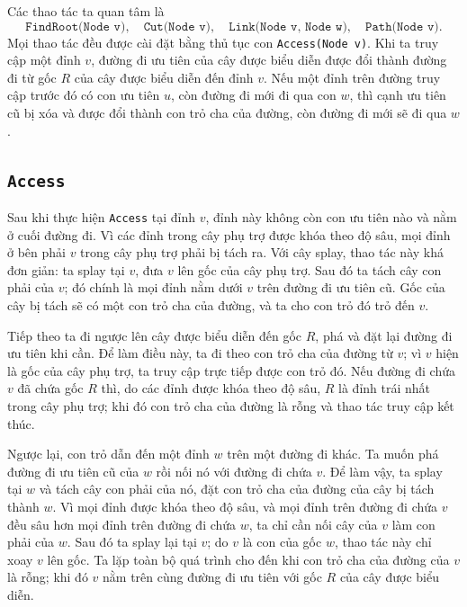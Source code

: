 \documentclass[11pt]{article}
\begin{document}
Các thao tác ta quan tâm là
\[
  \texttt{FindRoot(Node v)},\quad
  \texttt{Cut(Node v)},\quad
  \texttt{Link(Node v, Node w)},\quad
  \texttt{Path(Node v)}.
\]
Mọi thao tác đều được cài đặt bằng thủ tục con \texttt{Access(Node v)}. Khi ta truy cập một đỉnh
$v$, đường đi ưu tiên của cây được biểu diễn được đổi thành đường đi từ gốc $R$
của cây được biểu diễn đến đỉnh $v$. Nếu một đỉnh trên đường truy cập trước đó
có con ưu tiên $u$, còn đường đi mới đi qua con $w$, thì cạnh ưu tiên cũ bị xóa
và được đổi thành con trỏ cha của đường, còn đường đi mới sẽ đi qua $w$.

\subsection{\texttt{Access}}

Sau khi thực hiện \texttt{Access} tại đỉnh $v$, đỉnh này không còn con ưu tiên
nào và nằm ở cuối đường đi. Vì các đỉnh trong cây phụ trợ được khóa theo độ
sâu, mọi đỉnh ở bên phải $v$ trong cây phụ trợ phải bị tách ra. Với cây splay,
thao tác này khá đơn giản: ta splay tại $v$, đưa $v$ lên gốc của cây phụ trợ.
Sau đó ta tách cây con phải của $v$; đó chính là mọi đỉnh nằm dưới $v$ trên
đường đi ưu tiên cũ. Gốc của cây bị tách sẽ có một con trỏ cha của đường, và
ta cho con trỏ đó trỏ đến $v$.

Tiếp theo ta đi ngược lên cây được biểu diễn đến gốc $R$, phá và đặt lại đường
đi ưu tiên khi cần. Để làm điều này, ta đi theo con trỏ cha của đường từ $v$;
vì $v$ hiện là gốc của cây phụ trợ, ta truy cập trực tiếp được con trỏ đó. Nếu
đường đi chứa $v$ đã chứa gốc $R$ thì, do các đỉnh được khóa theo độ sâu, $R$
là đỉnh trái nhất trong cây phụ trợ; khi đó con trỏ cha của đường là rỗng và
thao tác truy cập kết thúc.

Ngược lại, con trỏ dẫn đến một đỉnh $w$ trên một đường đi khác. Ta muốn phá
đường đi ưu tiên cũ của $w$ rồi nối nó với đường đi chứa $v$. Để làm vậy, ta
splay tại $w$ và tách cây con phải của nó, đặt con trỏ cha của đường của cây
bị tách thành $w$. Vì mọi đỉnh được khóa theo độ sâu, và mọi đỉnh trên đường
đi chứa $v$ đều sâu hơn mọi đỉnh trên đường đi chứa $w$, ta chỉ cần nối cây
của $v$ làm con phải của $w$. Sau đó ta splay lại tại $v$; do $v$ là con của
gốc $w$, thao tác này chỉ xoay $v$ lên gốc. Ta lặp toàn bộ quá trình cho đến
khi con trỏ cha của đường của $v$ là rỗng; khi đó $v$ nằm trên cùng đường đi
ưu tiên với gốc $R$ của cây được biểu diễn.
\end{document}
